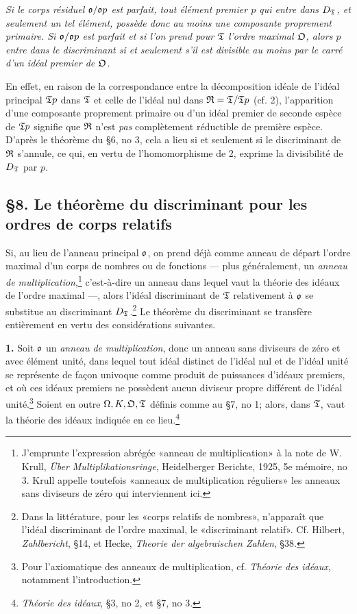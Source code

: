 \emph{Si le corps résiduel $\mathfrak o/\mathfrak o p$ est parfait, tout élément premier $p$ qui entre dans $D_\mathfrak T$, et seulement un tel élément, possède donc au moins une composante proprement primaire. Si $\mathfrak o/\mathfrak o p$ est parfait et si l'on prend pour $\mathfrak T$ l'ordre maximal $\mathfrak O$, alors $p$ entre dans le discriminant si et seulement s'il est divisible au moins par le carré d'un idéal premier de $\mathfrak O$.}

En effet, en raison de la correspondance entre la décomposition idéale de l'idéal principal $\mathfrak T p$ dans $\mathfrak T$ et celle de l'idéal nul dans $\mathfrak R=\mathfrak T/\mathfrak T p$ (cf. 2), l'apparition d'une composante proprement primaire ou d'un idéal premier de seconde espèce de $\mathfrak T p$ signifie que $\mathfrak R$ n'est \emph{pas} complètement réductible de première espèce. D'après le théorème du \S 6, no 3, cela a lieu si et seulement si le discriminant de $\mathfrak R$ s'annule, ce qui, en vertu de l'homomorphisme de 2, exprime la divisibilité de $D_\mathfrak T$ par $p$.

\subsection*{\S 8. Le théorème du discriminant pour les ordres de corps relatifs}

Si, au lieu de l'anneau principal $\mathfrak o$, on prend déjà comme anneau de départ l'ordre maximal d'un corps de nombres ou de fonctions --- plus généralement, un \emph{anneau de multiplication},\footnote{J'emprunte l'expression abrégée «anneau de multiplication» à la note de W. Krull, \emph{Über Multiplikationsringe}, Heidelberger Berichte, 1925, 5e mémoire, no 3. Krull appelle toutefois «anneaux de multiplication réguliers» les anneaux sans diviseurs de zéro qui interviennent ici.} c'est-à-dire un anneau dans lequel vaut la théorie des idéaux de l'ordre maximal ---, alors l'idéal discriminant de $\mathfrak T$ relativement à $\mathfrak o$ se substitue au discriminant $D_\mathfrak T$.\footnote{Dans la littérature, pour les «corps relatifs de nombres», n'apparaît que l'idéal discriminant de l'ordre maximal, le «discriminant relatif». Cf. Hilbert, \emph{Zahlbericht}, \S 14, et Hecke, \emph{Theorie der algebraischen Zahlen}, \S 38.} Le théorème du discriminant se transfère entièrement en vertu des considérations suivantes.

\textbf{1.} Soit $\mathfrak o$ un \emph{anneau de multiplication}, donc un anneau sans diviseurs de zéro et avec élément unité, dans lequel tout idéal distinct de l'idéal nul et de l'idéal unité se représente de façon univoque comme produit de puissances d'idéaux premiers, et où ces idéaux premiers ne possèdent aucun diviseur propre différent de l'idéal unité.\footnote{Pour l'axiomatique des anneaux de multiplication, cf. \emph{Théorie des idéaux}, notamment l'introduction.} Soient en outre $\Omega,K,\mathfrak O,\mathfrak T$ définis comme au \S 7, no 1; alors, dans $\mathfrak T$, vaut la théorie des idéaux indiquée en ce lieu.\footnote{\emph{Théorie des idéaux}, \S 3, no 2, et \S 7, no 3.}

